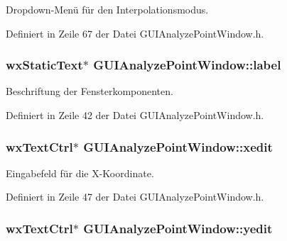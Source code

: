Dropdown-\/\-Menü für den Interpolationsmodus. 



Definiert in Zeile 67 der Datei G\-U\-I\-Analyze\-Point\-Window.\-h.

\hypertarget{classGUIAnalyzePointWindow_ae3f474800a7f7d9e4a897bdf33510f01}{
\subsubsection[{label}]{\setlength{\rightskip}{0pt plus 5cm}wx\-Static\-Text$\ast$ G\-U\-I\-Analyze\-Point\-Window\-::label\hspace{0.3cm}{\ttfamily [private]}}}\label{classGUIAnalyzePointWindow_ae3f474800a7f7d9e4a897bdf33510f01}


Beschriftung der Fensterkomponenten. 



Definiert in Zeile 42 der Datei G\-U\-I\-Analyze\-Point\-Window.\-h.

\hypertarget{classGUIAnalyzePointWindow_a4c3d50b2c5c38b8b757cdb1c04ea83b6}{
\subsubsection[{xedit}]{\setlength{\rightskip}{0pt plus 5cm}wx\-Text\-Ctrl$\ast$ G\-U\-I\-Analyze\-Point\-Window\-::xedit\hspace{0.3cm}{\ttfamily [private]}}}\label{classGUIAnalyzePointWindow_a4c3d50b2c5c38b8b757cdb1c04ea83b6}


Eingabefeld für die X-\/\-Koordinate. 



Definiert in Zeile 47 der Datei G\-U\-I\-Analyze\-Point\-Window.\-h.

\hypertarget{classGUIAnalyzePointWindow_ac4352df05ac2a001551801a90fc8bc42}{
\subsubsection[{yedit}]{\setlength{\rightskip}{0pt plus 5cm}wx\-Text\-Ctrl$\ast$ G\-U\-I\-Analyze\-Point\-Window\-::yedit\hspace{0.3cm}{\ttfamily [private]}}}\label{classGUIAnalyzePointWindow_ac4352df05ac2a001551801a90fc8bc42}



